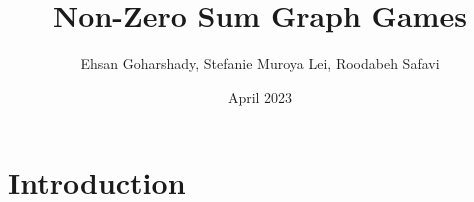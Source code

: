 \documentclass{article}
\title{Non-Zero Sum Graph Games}
\author{Ehsan Goharshady, Stefanie Muroya Lei, Roodabeh Safavi}
\date{April 2023}
\begin{document}
\maketitle

\section{Introduction}



\end{document}
